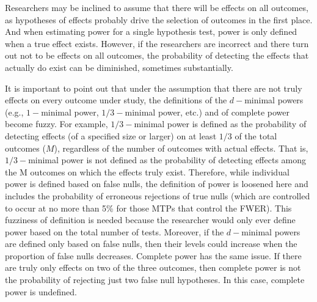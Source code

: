 \documentclass[
]{article}
\begin{document}
Researchers may be inclined to assume that there will be effects on all
outcomes, as hypotheses of effects probably drive the selection of
outcomes in the first place. And when estimating power for a single
hypothesis test, power is only defined when a true effect exists.
However, if the researchers are incorrect and there turn out not to be
effects on all outcomes, the probability of detecting the effects that
actually do exist can be diminished, sometimes substantially.

It is important to point out that under the assumption that there are
not truly effects on every outcome under study, the definitions of the
\(d-\)minimal powers (e.g., \(1-\)minimal power, \(1/3-\)minimal power,
etc.) and of complete power become fuzzy. For example, \(1/3-\)minimal
power is defined as the probability of detecting effects (of a specified
size or larger) on at least \(1/3\) of the total outcomes (\(M\)),
regardless of the number of outcomes with actual effects. That is,
\(1/3-\)minimal power is not defined as the probability of detecting
effects among the M outcomes on which the effects truly exist.
Therefore, while individual power is defined based on false nulls, the
definition of power is loosened here and includes the probability of
erroneous rejections of true nulls (which are controlled to occur at no
more than 5\% for those MTPs that control the FWER). This fuzziness of
definition is needed because the researcher would only ever define power
based on the total number of tests. Moreover, if the \(d-\)minimal
powers are defined only based on false nulls, then their levels could
increase when the proportion of false nulls decreases. Complete power
has the same issue. If there are truly only effects on two of the three
outcomes, then complete power is not the probability of rejecting just
two false null hypotheses. In this case, complete power is undefined.
\end{document}
